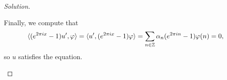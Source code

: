 \documentclass{article}
\theoremstyle{plain}
\theoremstyle{remark}
\newenvironment{solution}{\begin{proof}[Solution]\renewcommand\qedsymbol{}}{\end{proof}}
\renewcommand{\phi}{\varphi}
\newcommand{\Bb}{\mathbb}
\newcommand{\CC}{\Bb C}
\newcommand{\RR}{\Bb R}
\newcommand\ZZ{\Bb Z}
\DeclarePairedDelimiter{\ang}{\langle}{\rangle}
\newcommand\ind{\mathbbm 1} %
\begin{document}
\begin{solution}
\begin{enumerate}[(a)]
Finally, we compute that 
	\[
	\ang{(e^{2\pi i x} - 1) u', \phi} = \ang{u', (e^{2\pi i x} -1 )\phi} = \sum_{n \in \ZZ} \alpha_n (e^{2\pi i n} - 1) \phi(n) = 0,
	\]
	so $u$ satisfies the equation. 
	\end{enumerate}
\end{solution}
\end{document}
